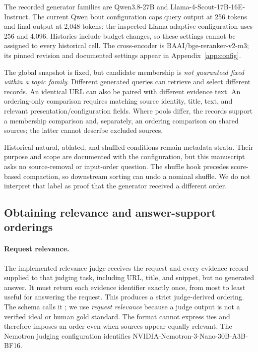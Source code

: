 The recorded generator families are Qwen3.8-27B and Llama-4-Scout-17B-16E-Instruct. The current Qwen bout configuration caps query output at 256 tokens and final output at 2,048 tokens; the inspected Llama adaptive configuration uses 256 and 4,096. Histories include budget changes, so these settings cannot be assigned to every historical cell.  The cross-encoder is BAAI/bge-reranker-v2-m3; its pinned revision and documented settings appear in Appendix~\ref{app:config}.

The global snapshot is fixed, but candidate membership is \emph{not guaranteed fixed within a topic family}. Different generated queries can retrieve and select different records. An identical URL can also be paired with different evidence text. An ordering-only comparison requires matching source identity, title, text, and relevant presentation/configuration fields. Where pools differ, the records support a membership comparison and, separately, an ordering comparison on shared sources; the latter cannot describe excluded sources.

Historical natural, ablated, and shuffled conditions remain metadata strata. Their purpose and scope are documented with the configuration, but this manuscript asks no source-removal or input-order question. The shuffle hook precedes score-based compaction, so downstream sorting can undo a nominal shuffle. We do not interpret that label as proof that the generator received a different order. 

\subsection{Obtaining relevance and answer-support orderings}
\label{sec:judges}
\paragraph{Request relevance.}
The implemented relevance judge receives the request and every evidence record supplied to that judging task, including URL, title, and snippet, but no generated answer. It must return each evidence identifier exactly once, from most to least useful for answering the request. This produces a strict judge-derived ordering. The schema calls it ; we use \emph{request relevance} because a judge output is not a verified ideal or human gold standard. The format cannot express ties and therefore imposes an order even when sources appear equally relevant. The Nemotron judging configuration identifies NVIDIA-Nemotron-3-Nano-30B-A3B-BF16. 

